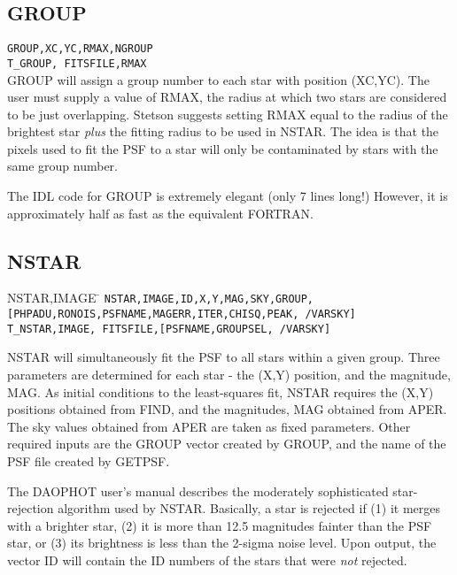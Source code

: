 \subsection{GROUP}
{\tt GROUP,XC,YC,RMAX,NGROUP} \\
{\tt T\_GROUP, FITSFILE,RMAX}     \\
                          
GROUP will assign a group number to each star with position (XC,YC).
The user must supply a value of RMAX, the radius at which two stars
are considered to be just overlapping.  Stetson suggests setting RMAX
equal to the radius of the brightest star {\em plus} the fitting radius
to be used in NSTAR.  The idea is that the pixels used to fit the PSF
to a star will only be contaminated by stars with the same group number.

The IDL code for GROUP is extremely elegant (only 7 lines long!)  However,
it is approximately half as fast as the equivalent FORTRAN.

\subsection{NSTAR}
\begin{tabbing}
NSTAR,IMAGE \= \kill
{\tt NSTAR,IMAGE,ID,X,Y,MAG,SKY,GROUP,} \\
\>    {\tt  [PHPADU,RONOIS,PSFNAME,MAGERR,ITER,CHISQ,PEAK, /VARSKY]} \\
{\tt T\_NSTAR,IMAGE, FITSFILE,[PSFNAME,GROUPSEL, /VARSKY]} \\
\end{tabbing}

NSTAR will simultaneously fit the PSF to all stars within a given group.
Three parameters are determined for each star - the (X,Y) position, and
the magnitude, MAG.  As initial conditions to the least-squares fit, NSTAR
requires the (X,Y) positions obtained from FIND, and the magnitudes, MAG
obtained from APER.   The sky values obtained from APER are taken as fixed
parameters.  Other required inputs are the GROUP vector created by GROUP,
and the name of the PSF file created by GETPSF.   

The DAOPHOT user's manual describes the moderately sophisticated star-rejection
algorithm used by NSTAR.   Basically, a star is rejected if (1) it merges
with a brighter star, (2)  it is more than 12.5 magnitudes fainter than
the PSF star, or (3) its brightness  is less than the 2-sigma noise level.
Upon output, the vector ID will contain the ID numbers of the stars that
were {\em not} rejected.

